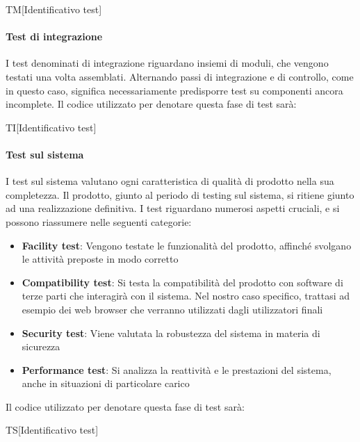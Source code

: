 		\begin{center}
			TM[Identificativo test]
		\end{center}
	
		\paragraph{Test di integrazione}
		I test denominati di integrazione riguardano insiemi di moduli, che vengono testati una volta assemblati. Alternando passi di integrazione e di controllo, come in questo caso, significa necessariamente predisporre test su componenti ancora incomplete. Il codice utilizzato per denotare questa fase di test sarà:
		
		\begin{center}
			TI[Identificativo test]
		\end{center}
		
		\paragraph{Test sul sistema}
		I test sul sistema valutano ogni caratteristica di qualità di prodotto nella sua completezza. Il prodotto, giunto al periodo di testing sul sistema, si ritiene giunto ad una realizzazione definitiva. I test riguardano numerosi aspetti cruciali, e si possono riassumere nelle seguenti categorie:
		
		\begin{itemize}
			\item \textbf{Facility test}: Vengono testate le funzionalità del prodotto, affinché svolgano le attività preposte in modo corretto
			\item \textbf{Compatibility test}: Si testa la compatibilità del prodotto con software di terze parti che interagirà con il sistema. Nel nostro caso specifico, trattasi ad esempio dei web browser che verranno utilizzati dagli utilizzatori finali
			\item \textbf{Security test}: Viene valutata la robustezza del sistema in materia di sicurezza
			\item \textbf{Performance test}: Si analizza la reattività e le prestazioni del sistema, anche in situazioni di particolare carico
		\end{itemize}
	
		Il codice utilizzato per denotare questa fase di test sarà:
		
		\begin{center}
			TS[Identificativo test]
		\end{center}
	
